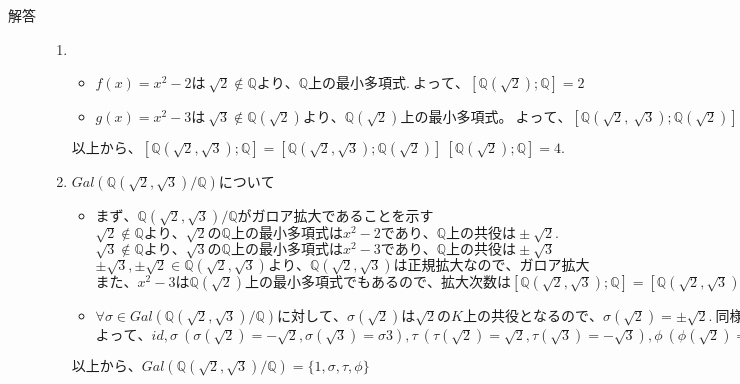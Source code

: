 \documentclass[dvipdfmx]{jsarticle}
\begin{document}
\begin{description}
  \item[解答] \mbox{}
  \begin{enumerate}
    \item
    \begin{itemize}
      \item $f(x) = x^2-2は \ \sqrt{2} \not \in \mathbb{Q}より、\mathbb{Q}上の最小多項式. \ よって、[\mathbb{Q}(\sqrt{2}) ; \mathbb{Q}] = 2$
      \item $g(x) = x^2-3は \ \sqrt{3} \not \in \mathbb{Q}(\sqrt{2})より、\mathbb{Q}(\sqrt{2})上の最小多項式。 \ よって、[\mathbb{Q}(\sqrt{2}, \ \sqrt{3}) ; \mathbb{Q}(\sqrt{2})] = 2$
    \end{itemize}
    $以上から、[\mathbb{Q}(\sqrt{2},\sqrt{3}); \mathbb{Q}] = [\mathbb{Q}(\sqrt{2},\sqrt{3}) ; \mathbb{Q}(\sqrt{2})] \  [\mathbb{Q}(\sqrt{2}) ; \mathbb{Q}] = 4.$

    \item $Gal(\mathbb{Q}(\sqrt{2},\sqrt{3}) / \mathbb{Q})について$
    \begin{itemize}
      \item $まず、\mathbb{Q}(\sqrt{2},\sqrt{3}) / \mathbb{Q}がガロア拡大であることを示す$\\
      $\sqrt{2} \not \in \mathbb{Q}より、\sqrt{2}の\mathbb{Q}上の最小多項式はx^2-2であり、\mathbb{Q}上の共役は \pm \sqrt{2}.$\\
      $\sqrt{3} \not \in \mathbb{Q}より、\sqrt{3}の\mathbb{Q}上の最小多項式はx^2-3であり、\mathbb{Q}上の共役は \pm \sqrt{3}$\\
      $\pm \sqrt{3},\pm \sqrt{2} \in \mathbb{Q}(\sqrt{2},\sqrt{3})より、\mathbb{Q}(\sqrt{2},\sqrt{3})は正規拡大なので、ガロア拡大$\\
      $また、x^2-3は\mathbb{Q}(\sqrt{2})上の最小多項式でもあるので、拡大次数は[\mathbb{Q}(\sqrt{2},\sqrt{3});\mathbb{Q}] = [\mathbb{Q}(\sqrt{2},\sqrt{3});\mathbb{Q}(\sqrt{2})] \ [\mathbb{Q}(\sqrt{2});\mathbb{Q}] = 4となる。$

      \item $\forall \sigma \in Gal(\mathbb{Q}(\sqrt{2},\sqrt{3}) / \mathbb{Q})に対して、\sigma(\sqrt{2})は \sqrt{2} のK上の共役となるので、\sigma(\sqrt{2}) = \pm \sqrt{2}. \ 同様に、\sigma(\sqrt{３})は \sqrt{3} のK上の共役となるので、\sigma(\sqrt{3}) = \pm \sqrt{3}$\\
      $よって、
      id,
      \sigma \ (\sigma(\sqrt{2}) = -\sqrt{2},\sigma(\sqrt{3}) = \sigma{3}),
      \tau \ (\tau(\sqrt{2}) = \sqrt{2},\tau(\sqrt{3}) = - \sqrt{3}),
      \phi \ (\phi(\sqrt{2}) = -\sqrt{2},\phi(\sqrt{3}) = - \sqrt{3}),
      \  Gal(\mathbb{Q}(\sqrt{2},\sqrt{3}) / \mathbb{Q})の元であり、拡大次数が４であることからこれがGal(\mathbb{Q}(\sqrt{2},\sqrt{3}) / \mathbb{Q})の全ての元である。$
    \end{itemize}
    $以上から、Gal(\mathbb{Q}(\sqrt{2},\sqrt{3}) / \mathbb{Q}) = \{1,\sigma,\tau,\phi\}$



\end{enumerate}
\end{description}
\end{document}
